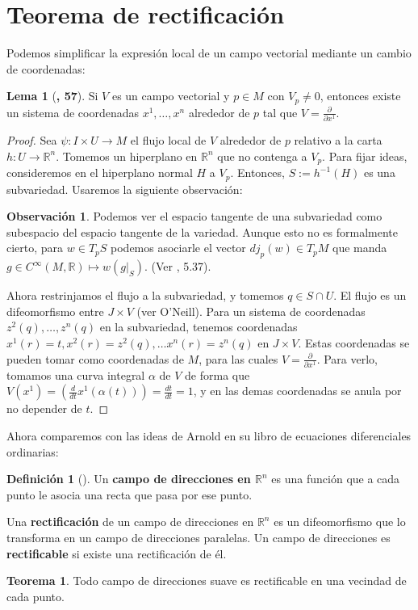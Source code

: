 \documentclass[spanish]{book}
\theoremstyle{definition}
\newtheorem*{defn}{Definición}
\newtheorem*{teo}{Teorema}
\newtheorem*{lema}{Lema}
\newtheorem*{obs}{Observación}
\newcommand{\R}{\mathbb{R}}
\newcommand{\Cinf}{C^\infty}
\begin{document}
	\section{Teorema de rectificación}
	Podemos simplificar la expresión local de un campo vectorial mediante un cambio de coordenadas:	
	\begin{lema}[\cite{ONeill}\textbf{, 57}]
		Si $V$ es un campo vectorial y $p\in M$ con $V_p\neq0$, entonces existe un sistema de coordenadas $x^1,\ldots,x^n$ alrededor de $p$ tal que $V=\frac{\partial}{\partial x^1}$.
	\end{lema}
	\begin{proof}
		Sea $\psi:I\times U\to M$ el flujo local de $V$ alrededor de $p$ relativo a la carta $h:U\to\R^n$. Tomemos un hiperplano en $\R^n$ que no contenga a $V_p$. Para fijar ideas, consideremos en el hiperplano normal $H$ a $V_p$. Entonces, $S:=h^{-1}(H)$ es una subvariedad. Usaremos la siguiente observación:
		\begin{obs}
			Podemos ver el espacio tangente de una subvariedad como subespacio del espacio tangente de la variedad. Aunque esto no es formalmente cierto, para $w\in T_pS$ podemos asociarle el vector $dj_p(w)\in T_pM$ que manda $g\in\Cinf(M,\R)\mapsto w(g|_S)$. (Ver \cite{Lee}, 5.37).
		\end{obs}
		Ahora restrinjamos el flujo a la subvariedad, y tomemos $q\in S\cap U$. El flujo es un difeomorfismo entre $J\times V$ (ver O'Neill). Para un sistema de coordenadas $z^2(q),\ldots,z^n(q)$ en la subvariedad, tenemos coordenadas $x^1(r)=t,x^2(r)=z^2(q),\ldots x^n(r)=z^n(q)$ en $ J\times V$. Estas coordenadas se pueden tomar como coordenadas de $M$, para las cuales $V=\frac{\partial}{\partial x^1}$. Para verlo, tomamos una curva integral $\alpha$ de $V$ de forma que $V(x^1)=(\frac{d}{dt}x^1(\alpha(t)))=\frac{dt}{dt}=1$, y en las demas coordenadas se anula por no depender de $t$.
	\end{proof}
	Ahora comparemos con las ideas de Arnold en su libro de ecuaciones diferenciales ordinarias:
	\begin{defn}[\cite{Arnold}]
		Un \textbf{campo de direcciones en $\R^n$} es una función que a cada punto le asocia una recta que pasa por ese punto.
		
		Una \textbf{rectificación} de un campo de direcciones en $\R^n$ es un difeomorfismo que lo transforma en un campo de direcciones paralelas. Un campo de direcciones es \textbf{rectificable} si existe una rectificación de él.
	\end{defn}
	\begin{teo}
		Todo campo de direcciones suave es rectificable en una vecindad de cada punto.
	\end{teo}
\end{document}
